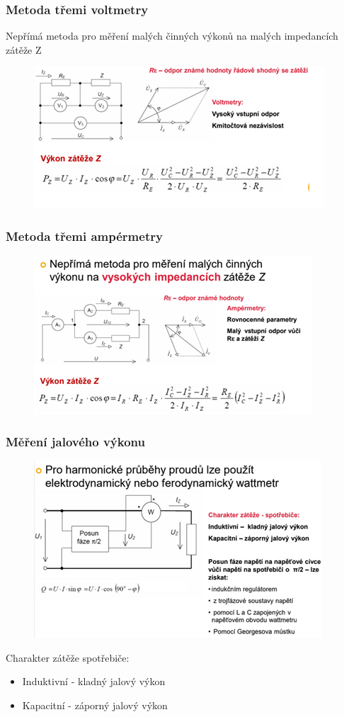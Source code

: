 \subsubsection*{Metoda třemi voltmetry}
Nepřímá metoda pro měření malých činných výkonů na malých impedancích zátěže Z 
\begin{figure}[H]
    \includegraphics*[scale = 1.5]{images/voltrmetry3.png}
\end{figure}

\subsubsection*{Metoda třemi ampérmetry}
\begin{figure}[H]
    \includegraphics*[scale = 1.5]{images/ampermetry3.png}
\end{figure}

\subsubsection*{Měření jalového výkonu}
\begin{figure}[H]
    \includegraphics*[scale = 1.3]{images/jalovec.png}
\end{figure}
Charakter zátěže spotřebiče:
\begin{itemize}
    \item Induktivní - kladný jalový výkon
    \item Kapacitní - záporný jalový výkon 
\end{itemize}

